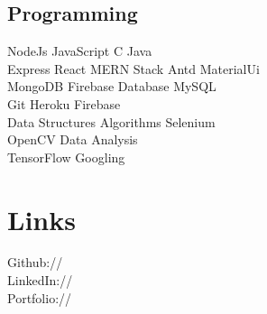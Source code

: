 \documentclass[]{deedy-resume-openfont}
\begin{document}
\begin{minipage}[t]{0.43\textwidth}
\subsection{Programming}
\textbullet{} NodeJs \textbullet{} JavaScript \textbullet{} C \textbullet{} Java\\ 
\textbullet{} Express \textbullet{} React \textbullet{} MERN Stack \textbullet{} Antd 
\textbullet{} MaterialUi\\
MongoDB \textbullet{} Firebase Database \textbullet{} MySQL\\
\textbullet{} Git \textbullet{} Heroku \textbullet{} Firebase   \\
\textbullet{} Data Structures \textbullet{} Algorithms \textbullet{} Selenium\\ \textbullet{} OpenCV \textbullet{} Data Analysis\\ \textbullet{} TensorFlow \textbullet{} Googling\\

\vspace{5pt}
\section{Links} 
Github:// \href{https://github.com/mithlesh1203}{}\\
LinkedIn://  \href{https://www.linkedin.com/in/mithlesh-kumar-450a08160/}{} \\
Portfolio:// \href{https://mithleshkumar-portfolio.netlify.app/}{}


\end{minipage}
\end{document}
